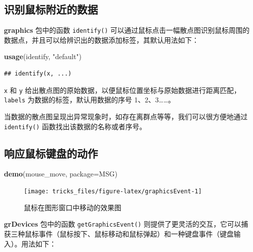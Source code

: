 \documentclass[
  b5paper,
  UTF8,twoside]{book}
\newenvironment{Shaded}{\begin{snugshade}}{\end{snugshade}}
\newcommand{\AttributeTok}[1]{\textcolor[rgb]{0.13,0.29,0.53}{#1}}
\newcommand{\FunctionTok}[1]{\textcolor[rgb]{0.13,0.29,0.53}{\textbf{#1}}}
\newcommand{\NormalTok}[1]{#1}
\newcommand{\StringTok}[1]{\textcolor[rgb]{0.31,0.60,0.02}{#1}}
\begin{document}
\subsection{识别鼠标附近的数据}\label{ux8bc6ux522bux9f20ux6807ux9644ux8fd1ux7684ux6570ux636e}

\textbf{graphics} 包中的函数 \texttt{identify()} 可以通过鼠标点击一幅散点图识别鼠标周围的数据点，并且可以给辨识出的数据添加标签，其默认用法如下：

\begin{Shaded}
\begin{Highlighting}[]
\FunctionTok{usage}\NormalTok{(identify, }\StringTok{"default"}\NormalTok{)}
\end{Highlighting}
\end{Shaded}

\begin{verbatim}
## identify(x, ...)
\end{verbatim}

\texttt{x} 和 \texttt{y} 给出散点图的原始数据，以便鼠标位置坐标与原始数据进行距离匹配，\texttt{labels} 为数据的标签，默认用数据的序号 1、2、3\ldots\ldots。

当数据的散点图呈现出异常现象时，如存在离群点等等，我们可以很方便地通过 \texttt{identify()} 函数找出该数据的名称或者序号。

\subsection{响应鼠标键盘的动作}\label{ux54cdux5e94ux9f20ux6807ux952eux76d8ux7684ux52a8ux4f5c}

\begin{Shaded}
\begin{Highlighting}[]
\FunctionTok{demo}\NormalTok{(}\StringTok{\textquotesingle{}mouse\_move\textquotesingle{}}\NormalTok{, }\AttributeTok{package=}\StringTok{\textquotesingle{}MSG\textquotesingle{}}\NormalTok{)}
\end{Highlighting}
\end{Shaded}

\begin{figure}

{\centering \texttt{[image: tricks\_files/figure-latex/graphicsEvent-1]} 

}

\caption{鼠标在图形窗口中移动的效果图}\label{fig:graphicsEvent}
\end{figure}

\textbf{grDevices} 包中的函数 \texttt{getGraphicsEvent()} 则提供了更灵活的交互，它可以捕获三种鼠标事件（鼠标按下、鼠标移动和鼠标弹起）和一种键盘事件（键盘输入）。用法如下：
\end{document}
